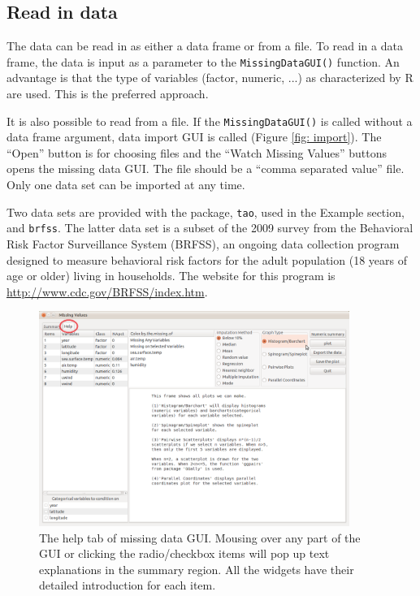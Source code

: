 \documentclass[english]{article}
\begin{document}
\subsection{Read in data}

The data can be read in as either a data frame or from a file. To read in a data frame, the data is input as a parameter to the \texttt{MissingDataGUI()} function.  An advantage is that the type of variables (factor, numeric, ...) as characterized by R are used. This is the preferred approach.

It is also possible to read from a file.  If the \texttt{MissingDataGUI()} is called without a data frame argument, data import GUI is called (Figure \ref{fig: import}).  The ``Open'' button is for choosing files and the ``Watch Missing Values'' buttons opens the missing data GUI. The file should be a ``comma separated value'' file. Only one data set can be imported at any time.

Two data sets are provided with the package, \texttt{tao}, used in the Example section, and \texttt{brfss}. The latter data set is a subset of the 2009 survey from the Behavioral Risk Factor Surveillance System (BRFSS), an ongoing data collection program designed to measure behavioral risk factors for the adult population (18 years of age or older) living in households. The website for this program is \url{http://www.cdc.gov/BRFSS/index.htm}.


\begin{center}
%
\begin{figure}[h]
\begin{centering}
\includegraphics[width=0.9\textwidth]{Miss_fig7}
\par\end{centering}

\caption{The help tab of missing data GUI. Mousing over any part of the GUI or clicking the radio/checkbox items will pop up text explanations in the summary region. All the widgets have their detailed introduction for each item.}
\label{fig: missingGUI-help}
\end{figure}

\par\end{center}
\end{document}
